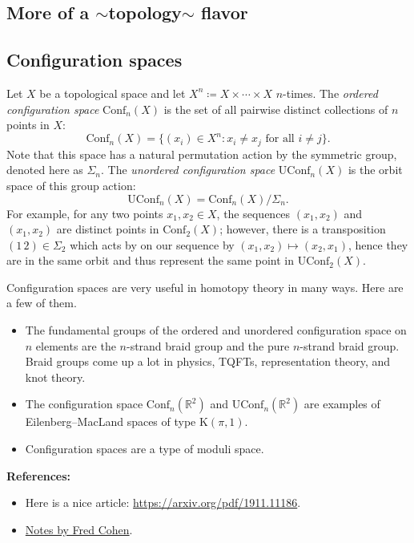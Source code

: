\documentclass[10pt]{amsart}
\theoremstyle{definition}
\newcommand{\cdef}[1]{\textcolor{Bittersweet}{#1}}
\begin{document}
\subsection{More of a $\sim$topology$\sim$ flavor}
\subsection*{Configuration spaces}
Let $X$ be a topological space and let $X^n \coloneq X \times \cdots \times X$ $n$-times. The \cdef{\emph{ordered configuration space}} $\text{Conf}_n(X)$ is the set of all pairwise distinct collections of $n$ points in $X$:
\[
    \mathrm{Conf}_n(X) = \{(x_i) \in X^n : x_i \neq x_j \text{ for all }i\neq j\}.
\]
Note that this space has a natural permutation action by the symmetric group, denoted here as $\Sigma_n$. The \cdef{\emph{unordered configuration space}} $\text{UConf}_n(X)$ is the orbit space of this group action:
\[
    \text{UConf}_n(X) = \text{Conf}_n(X)/\Sigma_n.
\]
For example, for any two points $x_1, x_2 \in X$, the sequences $(x_1,x_2)$ and $(x_1, x_2)$ are distinct points in $\text{Conf}_2(X)$; however, there is a transposition $(1 \,2) \in \Sigma_2$ which acts by on our sequence by $(x_1, x_2) \mapsto (x_2, x_1)$, hence they are in the same orbit and thus represent the same point in $\text{UConf}_2(X)$.

Configuration spaces are very useful in homotopy theory in many ways. Here are a few of them.
\begin{itemize}
    \item The fundamental groups of the ordered and unordered configuration space on $n$ elements are the $n$-strand braid group and the pure $n$-strand braid group. Braid groups come up a lot in physics, TQFTs, representation theory, and knot theory.
    \item The configuration space $\text{Conf}_n(\mathbb{R}^2)$ and $\text{UConf}_n(\mathbb{R}^2)$ are examples of Eilenberg--MacLand spaces of type $\text{K}(\pi, 1)$.
    \item Configuration spaces are a type of moduli space.
\end{itemize}

\textbf{References:}
\begin{itemize}
    \item Here is a nice article: \href{https://arxiv.org/pdf/1911.11186}{https://arxiv.org/pdf/1911.11186}.
    \item \href{https://ncatlab.org/nlab/files/Cohen-IntroConfigSpaces.pdf}{Notes by Fred Cohen}.
\end{itemize}
\end{document}

